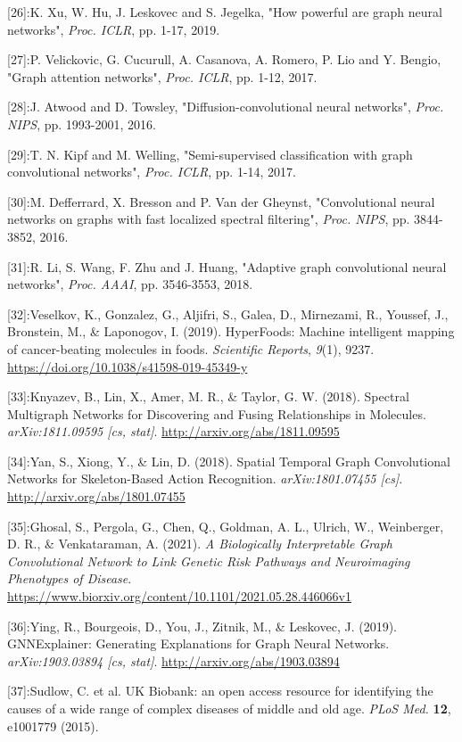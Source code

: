 \documentclass[
]{article}
\begin{document}
{[}26{]}:K. Xu, W. Hu, J. Leskovec and S. Jegelka, "How powerful are
graph neural networks", \emph{Proc. ICLR}, pp. 1-17, 2019.

{[}27{]}:P. Velickovic, G. Cucurull, A. Casanova, A. Romero, P. Lio and
Y. Bengio, "Graph attention networks", \emph{Proc. ICLR}, pp. 1-12,
2017.

{[}28{]}:J. Atwood and D. Towsley, "Diffusion-convolutional neural
networks", \emph{Proc. NIPS}, pp. 1993-2001, 2016.

{[}29{]}:T. N. Kipf and M. Welling, "Semi-supervised classification with
graph convolutional networks", \emph{Proc. ICLR}, pp. 1-14, 2017.

{[}30{]}:M. Defferrard, X. Bresson and P. Van der Gheynst,
"Convolutional neural networks on graphs with fast localized spectral
filtering", \emph{Proc. NIPS}, pp. 3844-3852, 2016.

{[}31{]}:R. Li, S. Wang, F. Zhu and J. Huang, "Adaptive graph
convolutional neural networks", \emph{Proc. AAAI}, pp. 3546-3553, 2018.

{[}32{]}:Veselkov, K., Gonzalez, G., Aljifri, S., Galea, D., Mirnezami,
R., Youssef, J., Bronstein, M., \& Laponogov, I. (2019). HyperFoods:
Machine intelligent mapping of cancer-beating molecules in foods.
\emph{Scientific Reports}, \emph{9}(1), 9237.
\url{https://doi.org/10.1038/s41598-019-45349-y}

{[}33{]}:Knyazev, B., Lin, X., Amer, M. R., \& Taylor, G. W. (2018).
Spectral Multigraph Networks for Discovering and Fusing Relationships in
Molecules. \emph{arXiv:1811.09595 {[}cs, stat{]}}.
\url{http://arxiv.org/abs/1811.09595}

{[}34{]}:Yan, S., Xiong, Y., \& Lin, D. (2018). Spatial Temporal Graph
Convolutional Networks for Skeleton-Based Action Recognition.
\emph{arXiv:1801.07455 {[}cs{]}}. \url{http://arxiv.org/abs/1801.07455}

{[}35{]}:Ghosal, S., Pergola, G., Chen, Q., Goldman, A. L., Ulrich, W.,
Weinberger, D. R., \& Venkataraman, A. (2021). \emph{A Biologically
Interpretable Graph Convolutional Network to Link Genetic Risk Pathways
and Neuroimaging Phenotypes of Disease}.
\url{https://www.biorxiv.org/content/10.1101/2021.05.28.446066v1}

{[}36{]}:Ying, R., Bourgeois, D., You, J., Zitnik, M., \& Leskovec, J.
(2019). GNNExplainer: Generating Explanations for Graph Neural Networks.
\emph{arXiv:1903.03894 {[}cs, stat{]}}.
\url{http://arxiv.org/abs/1903.03894}

{[}37{]}:Sudlow, C. et al. UK Biobank: an open access resource for
identifying the causes of a wide range of complex diseases of middle and
old age. \emph{PLoS Med.} \textbf{12}, e1001779 (2015).
\end{document}
